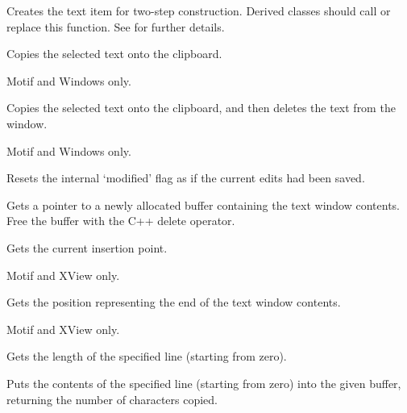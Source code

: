 Creates the text item for two-step construction. Derived classes
should call or replace this function. See 
for further details.



Copies the selected text onto the clipboard.

Motif and Windows only.



Copies the selected text onto the clipboard, and then
deletes the text from the window.

Motif and Windows only.



Resets the internal `modified' flag as if the current edits had been saved.



Gets a pointer to a newly allocated buffer containing the text window contents.
Free the buffer with the C++ delete operator.



Gets the current insertion point.

Motif and XView only.



Gets the position representing the end of the text window contents.

Motif and XView only.



Gets the length of the specified line (starting from zero).



Puts the contents of the specified line (starting from zero) into
the given buffer, returning the number of characters copied.

